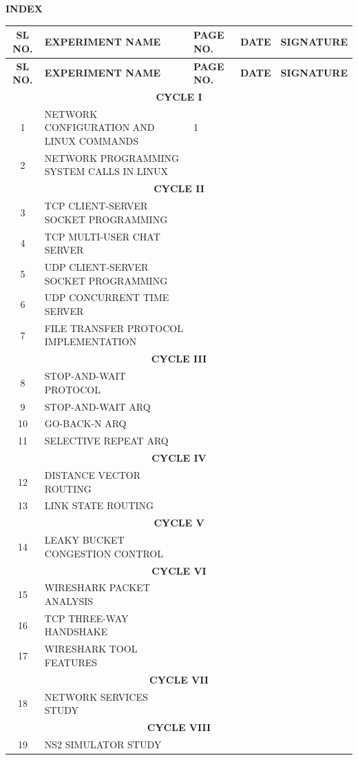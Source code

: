 \begin{center}
\vspace*{1cm}
{\LARGE \textbf{INDEX}}
\vspace{0.5cm}
\end{center}
\setlength{\LTleft}{\fill}
\setlength{\LTright}{\fill}

\begin{longtable}{|c|p{7cm}|p{1cm}|c|c|}
\hline
\textbf{SL NO.} & \centering\textbf{EXPERIMENT NAME} & \textbf{PAGE NO.} & \textbf{DATE} & \textbf{SIGNATURE} \tabularnewline
\hline
\endfirsthead

\hline
\textbf{SL NO.} & \centering\textbf{EXPERIMENT NAME} & \textbf{PAGE NO.} & \textbf{DATE} & \textbf{SIGNATURE} \tabularnewline
\hline
\endhead

\multicolumn{5}{|c|}{\textbf{CYCLE I}} \tabularnewline
\hline
1 & NETWORK CONFIGURATION AND LINUX COMMANDS & 1 &  & \tabularnewline \hline
2 & NETWORK PROGRAMMING SYSTEM CALLS IN LINUX &  &  & \tabularnewline \hline

\multicolumn{5}{|c|}{\textbf{CYCLE II}} \tabularnewline
\hline
3 & TCP CLIENT-SERVER SOCKET PROGRAMMING &  &  & \tabularnewline \hline
4 & TCP MULTI-USER CHAT SERVER &  &  & \tabularnewline \hline
5 & UDP CLIENT-SERVER SOCKET PROGRAMMING &  &  & \tabularnewline \hline
6 & UDP CONCURRENT TIME SERVER &  &  & \tabularnewline \hline
7 & FILE TRANSFER PROTOCOL IMPLEMENTATION &  &  & \tabularnewline \hline

\multicolumn{5}{|c|}{\textbf{CYCLE III}} \tabularnewline
\hline
8 & STOP-AND-WAIT PROTOCOL &  &  & \tabularnewline \hline
9 & STOP-AND-WAIT ARQ &  &  & \tabularnewline \hline
10 & GO-BACK-N ARQ &  &  & \tabularnewline \hline
11 & SELECTIVE REPEAT ARQ &  &  & \tabularnewline \hline

\multicolumn{5}{|c|}{\textbf{CYCLE IV}} \tabularnewline
\hline
12 & DISTANCE VECTOR ROUTING &  &  & \tabularnewline \hline
13 & LINK STATE ROUTING &  &  & \tabularnewline \hline

\multicolumn{5}{|c|}{\textbf{CYCLE V}} \tabularnewline
\hline
14 & LEAKY BUCKET CONGESTION CONTROL &  &  & \tabularnewline \hline

\multicolumn{5}{|c|}{\textbf{CYCLE VI}} \tabularnewline
\hline
15 & WIRESHARK PACKET ANALYSIS &  &  & \tabularnewline \hline
16 & TCP THREE-WAY HANDSHAKE &  &  & \tabularnewline \hline
17 & WIRESHARK TOOL FEATURES &  &  & \tabularnewline \hline

\multicolumn{5}{|c|}{\textbf{CYCLE VII}} \tabularnewline
\hline
18 & NETWORK SERVICES STUDY &  &  & \tabularnewline \hline

\multicolumn{5}{|c|}{\textbf{CYCLE VIII}} \tabularnewline
\hline
19 & NS2 SIMULATOR STUDY &  &  & \tabularnewline \hline

\end{longtable}
